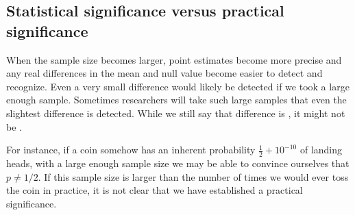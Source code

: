 \subsection{Statistical significance versus practical significance}

	When the sample size becomes larger, point estimates become more precise and
	any real differences in the mean and null value become easier to detect and recognize.
	Even a very small difference would likely be detected if we took a large enough sample.
	Sometimes researchers will take such large samples that even the slightest difference is detected.
	While we still say that difference is , it might not be .

	For instance, if a coin somehow has an inherent probability $\frac12+10^{-10}$ of landing heads,
	with a large enough sample size we may be able to convince ourselves that $p\ne 1/2$.
	If this sample size is larger than the number of times we would ever toss the coin in practice,
	it is not clear that we have established a practical significance.
